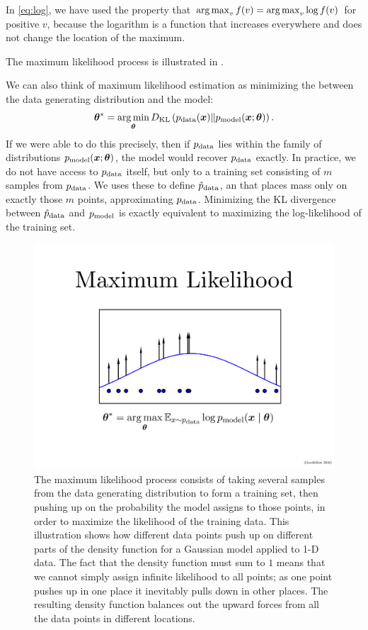 In \eqref{eq:log}, we have used the property that $\operatorname*{arg\,max}_v f(v) = \operatorname*{arg\,max}_v \log f(v)$ for 
positive $v$, because the logarithm is a function that increases everywhere and does not change
the location of the maximum.

The maximum likelihood process is illustrated in .

We can also think of maximum likelihood estimation as minimizing the
 between the data generating distribution and the
model:
\begin{equation}
{\bm{\theta}}^* = \operatorname*{arg\,min}_{\bm{\theta}} D_{\mathrm{KL}}\left( p_{\rm{data}}({\bm{x}}) \Vert p_{\rm{model}}({\bm{x}} ; {\bm{\theta}}) \right).
\label{eq:kl}
\end{equation}
If we were able to do this precisely, then if $p_{\rm{data}}$ lies within the family of distributions
$p_{\rm{model}}({\bm{x}} ; {\bm{\theta}})$, the model would recover $p_{\rm{data}}$ exactly.
In practice, we do not have access to $p_{\rm{data}}$ itself, but only to a training set
consisting of $m$ samples from $p_{\rm{data}}$.
We uses these to define $\hat{p}_{\rm{data}}$, an  that places mass only
on exactly those $m$ points, approximating $p_{\rm{data}}$.
Minimizing the KL divergence between $\hat{p}_{\rm{data}}$ and $p_{\rm{model}}$ is exactly equivalent to maximizing
the log-likelihood of the training set.

\begin{figure}
\centering
\includegraphics[width=\textwidth]{mle.pdf}
\caption{The maximum likelihood process consists of taking several samples from
  the data generating distribution to form a training set, then pushing up on the
  probability the model assigns to those points, in order to maximize the likelihood
  of the training data.
  This illustration shows how different data points push up on different parts of
  the density function for a Gaussian model applied to 1-D data.
  The fact that the density function must sum to $1$ means that we cannot simply
  assign infinite likelihood to all points; as one point pushes up in one place
  it inevitably pulls down in other places.
  The resulting density function balances out the upward forces from all the data
  points in different locations.
}
\label{fig:mle}
\end{figure}


